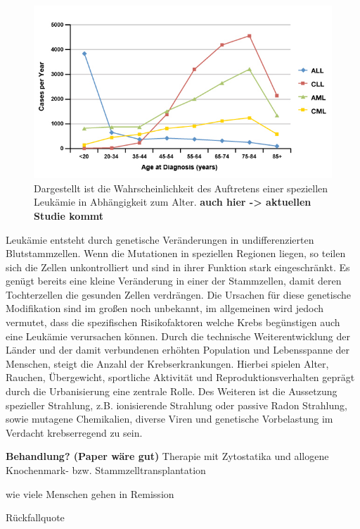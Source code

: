 \begin{figure}
\centering
\includegraphics[width=.95\textwidth]{images/Age_AML_ALL.jpg}
\caption{Dargestellt ist die Wahrscheinlichkeit des Auftretens einer speziellen Leukämie in Abhängigkeit zum Alter. \textbf{auch hier -> aktuellen Studie kommt}}
\label{fig:Age_AML_ALL}
\end{figure}

Leukämie entsteht durch genetische Veränderungen in undifferenzierten Blutstammzellen. Wenn die Mutationen in speziellen Regionen liegen\cite{Wakita.2016}, so teilen sich die Zellen unkontrolliert und sind in ihrer Funktion stark eingeschränkt. Es genügt bereits eine kleine Veränderung in einer der Stammzellen, damit deren Tochterzellen die gesunden Zellen verdrängen. Die Ursachen für diese genetische Modifikation sind im großen noch unbekannt, im allgemeinen wird jedoch vermutet, dass die spezifischen Risikofaktoren welche Krebs begünstigen auch eine Leukämie verursachen können\cite{Petit.2014}. Durch die technische Weiterentwicklung der Länder und der damit verbundenen erhöhten Population und Lebensspanne der Menschen, steigt die Anzahl der Krebserkrankungen. Hierbei spielen Alter, Rauchen, Übergewicht, sportliche Aktivität und Reproduktionsverhalten geprägt durch die Urbanisierung eine zentrale Rolle\cite{Torre.2015}. Des Weiteren ist die Aussetzung spezieller Strahlung, z.B. ionisierende Strahlung oder passive Radon Strahlung, sowie mutagene Chemikalien, diverse Viren und genetische Vorbelastung im Verdacht krebserregend zu sein.

\textbf{Behandlung? (Paper wäre gut)}
Therapie mit Zytostatika und allogene Knochenmark- bzw. Stammzelltransplantation

wie viele Menschen gehen in Remission 

Rückfallquote



